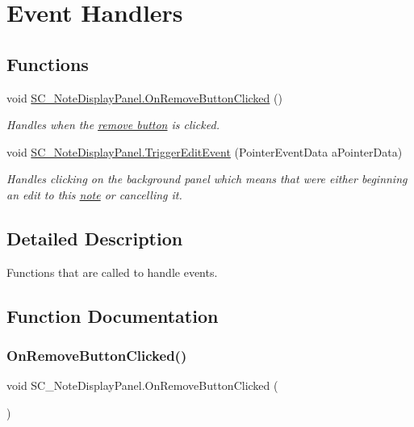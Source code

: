 \hypertarget{group___s_c___n_d_p_handlers}{}\section{Event Handlers}
\label{group___s_c___n_d_p_handlers}
\subsection*{Functions}
\begin{DoxyCompactItemize}
\item 
void \hyperlink{group___s_c___n_d_p_handlers_ga0b545f6cd12ce56258842cb1036bceec}{S\+C\+\_\+\+Note\+Display\+Panel.\+On\+Remove\+Button\+Clicked} ()
\begin{DoxyCompactList}\small\item\em Handles when the \hyperlink{group___s_c___n_d_p_priv_var_gac9af0bdc5b04a52ab9e7c13a0ad01ab7}{remove button} is clicked. \end{DoxyCompactList}\item 
void \hyperlink{group___s_c___n_d_p_handlers_ga7b25bcc6b76ae0894ac6eefde417caf1}{S\+C\+\_\+\+Note\+Display\+Panel.\+Trigger\+Edit\+Event} (Pointer\+Event\+Data a\+Pointer\+Data)
\begin{DoxyCompactList}\small\item\em Handles clicking on the background panel which means that we\textquotesingle{}re either beginning an edit to this \hyperlink{group___music_structs_struct_music_1_1_combined_note}{note} or cancelling it. \end{DoxyCompactList}\end{DoxyCompactItemize}


\subsection{Detailed Description}
Functions that are called to handle events. 

\subsection{Function Documentation}
\mbox{\label{group___s_c___n_d_p_handlers_ga0b545f6cd12ce56258842cb1036bceec}} 
\subsubsection{\texorpdfstring{On\+Remove\+Button\+Clicked()}{OnRemoveButtonClicked()}}
{\footnotesize\ttfamily void S\+C\+\_\+\+Note\+Display\+Panel.\+On\+Remove\+Button\+Clicked (\begin{DoxyParamCaption}{ }\end{DoxyParamCaption})}



